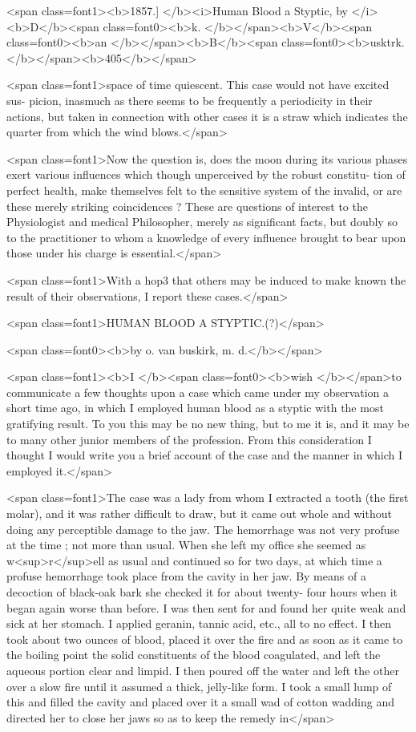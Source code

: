<span class=font1><b>1857.]     </b><i>Human Blood a Styptic, by </i><b>D</b><span class=font0><b>k. </b></span><b>V</b><span class=font0><b>an </b></span><b>B</b><span class=font0><b>usktrk. </b></span><b>405</b></span>

<span class=font1>space of time quiescent. This case would not have excited sus-
picion, inasmuch as there seems to be frequently a periodicity in their
actions, but taken in connection with other cases it is a straw which
indicates the quarter from which the wind blows.</span>

<span class=font1>Now the question is, does the moon during its various phases exert
various influences which though unperceived by the robust constitu-
tion of perfect health, make themselves felt to the sensitive system
of the invalid, or are these merely striking coincidences ? These are
questions of interest to the Physiologist and medical Philosopher,
merely as significant facts, but doubly so to the practitioner to whom
a knowledge of every influence brought to bear upon those under his
charge is essential.</span>

<span class=font1>With a hop3 that others may be induced to make known the result
of their observations, I report these cases.</span>

<span class=font1>HUMAN BLOOD A STYPTIC.(?)</span>

<span class=font0><b>by o. van buskirk, m. d.</b></span>

<span class=font1><b>I </b><span class=font0><b>wish </b></span>to communicate a few thoughts upon a case which came under
my observation a short time ago, in which I employed human blood as
a styptic with the most gratifying result. To you this may be no new
thing, but to me it is, and it may be to many other junior members of
the profession. From this consideration I thought I would write you
a brief account of the case and the manner in which I employed it.</span>

<span class=font1>The case was a lady from whom I extracted a tooth (the first molar),
and it was rather difficult to draw, but it came out whole and without
doing any perceptible damage to the jaw. The hemorrhage was not
very profuse at the time ; not more than usual. When she left my office
she seemed as w<sup>r</sup>ell as usual and continued so for two days, at which
time a profuse hemorrhage took place from the cavity in her jaw. By
means of a decoction of black-oak bark she checked it for about twenty-
four hours when it began again worse than before. I was then sent for
and found her quite weak and sick at her stomach. I applied geranin,
tannic acid, etc., all to no effect. I then took about two ounces of blood,
placed it over the fire and as soon as it came to the boiling point the
solid constituents of the blood coagulated, and left the aqueous portion
clear and limpid. I then poured off the water and left the other over
a slow fire until it assumed a thick, jelly-like form. I took a small lump
of this and filled the cavity and placed over it a small wad of cotton
wadding and directed her to close her jaws so as to keep the remedy in</span>
